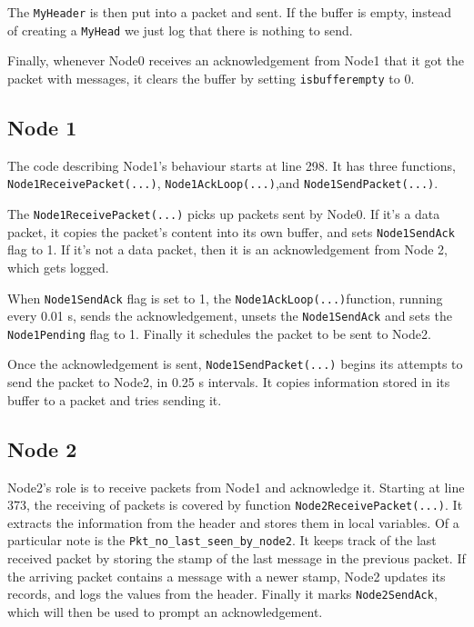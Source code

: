 \documentclass[11pt,journal]{article}
\begin{document}
	The \texttt{MyHeader} is then put into a packet and sent. If the buffer is empty, instead of creating a \texttt{MyHead} we just log that there is nothing to send.
	
	Finally, whenever Node0 receives an acknowledgement from Node1 that it got the packet with messages, it clears the buffer by setting \texttt{isbufferempty} to 0.
	
	\subsection{Node 1}
	The code describing Node1's behaviour starts at line 298. It has three functions, \texttt{Node1ReceivePacket(...)}, \texttt{Node1AckLoop(...)},and \texttt{Node1SendPacket(...)}. 
	
	The \texttt{Node1ReceivePacket(...)} picks up packets sent by Node0. If it's a data packet, it copies the packet's content into its own buffer, and sets \texttt{Node1SendAck} flag to 1. If it's not a data packet, then it is an acknowledgement from Node 2, which gets logged.
	
	When \texttt{Node1SendAck} flag is set to 1, the \texttt{Node1AckLoop(...)}function, running every 0.01 s, sends the acknowledgement, unsets the \texttt{Node1SendAck} and sets the \texttt{Node1Pending} flag to 1. Finally it schedules the packet to be sent to Node2.
	
	Once the acknowledgement is sent, \texttt{Node1SendPacket(...)} begins its attempts to send the packet to Node2, in 0.25 s intervals. It copies information stored in its buffer to a packet and tries sending it.
	
	\subsection{Node 2}
	
	Node2's role is to receive packets from Node1 and acknowledge it. Starting at line 373, the receiving of packets is covered by function \texttt{Node2ReceivePacket(...)}. It extracts the information from the header and stores them in local variables. Of a particular note is the \texttt{Pkt\_no\_last\_seen\_by\_node2}. It keeps track of the last received packet by storing the stamp of the last message in the previous packet. If the arriving packet contains a message with a newer stamp, Node2 updates its records, and logs the values from the header. Finally it marks \texttt{Node2SendAck}, which will then be used to prompt an acknowledgement.
	
\end{document}
